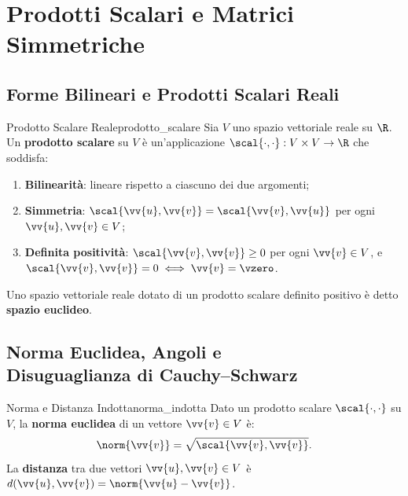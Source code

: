 
\chapter{Prodotti Scalari e Matrici Simmetriche}
\label{chap:prodotti_scalari_spettrale}

\section{Forme Bilineari e Prodotti Scalari Reali}

\begin{definizione}{Prodotto Scalare Reale}{prodotto_scalare}
Sia $V$ uno spazio vettoriale reale su $\R$. Un \textbf{prodotto scalare} su $V$ è un'applicazione $\scal{\cdot, \cdot}: V \times V \to \R$ che soddisfa:
\begin{enumerate}[label=(\roman*)]
    \item \textbf{Bilinearità}: lineare rispetto a ciascuno dei due argomenti;
    \item \textbf{Simmetria}: $\scal{\vv{u}, \vv{v}} = \scal{\vv{v}, \vv{u}}$ per ogni $\vv{u}, \vv{v} \in V$;
    \item \textbf{Definita positività}: $\scal{\vv{v}, \vv{v}} \ge 0$ per ogni $\vv{v} \in V$, e $\scal{\vv{v}, \vv{v}} = 0 \iff \vv{v} = \vzero$.
\end{enumerate}
Uno spazio vettoriale reale dotato di un prodotto scalare definito positivo è detto \textbf{spazio euclideo}.
\end{definizione}

\section[Norma Euclidea, Angoli e Disuguaglianza di Cauchy-Schwarz]{Norma Euclidea, Angoli e\\Disuguaglianza di Cauchy--Schwarz}

\begin{definizione}{Norma e Distanza Indotta}{norma_indotta}
Dato un prodotto scalare $\scal{\cdot, \cdot}$ su $V$, la \textbf{norma euclidea} di un vettore $\vv{v} \in V$ è:
\begin{equation}
    \norm{\vv{v}} = \sqrt{\scal{\vv{v}, \vv{v}}}.
\end{equation}
La \textbf{distanza} tra due vettori $\vv{u}, \vv{v} \in V$ è $d(\vv{u}, \vv{v}) = \norm{\vv{u} - \vv{v}}$.
\end{definizione}

